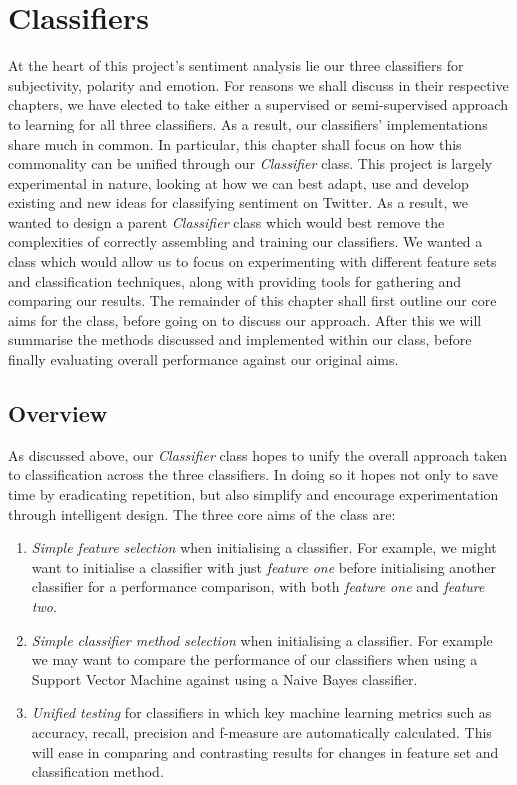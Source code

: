 \chapter{Classifiers}
\label{classifiers}

At the heart of this project's sentiment analysis lie our three classifiers for subjectivity, polarity and emotion. For reasons we shall discuss in their respective chapters, we have elected to take either a supervised or semi-supervised approach to learning for all three classifiers. As a result, our classifiers' implementations share much in common. In particular, this chapter shall focus on how this commonality can be unified through our \emph{Classifier} class. This project is largely experimental in nature, looking at how we can best adapt, use and develop existing and new ideas for classifying sentiment on Twitter. As a result, we wanted to design a parent \emph{Classifier} class which would best remove the  complexities of correctly assembling and training our classifiers. We wanted a class which would allow us to focus on experimenting with different feature sets and classification techniques, along with providing tools for gathering and comparing our results. The remainder of this chapter shall first outline our core aims for the class, before going on to discuss our approach. After this we will summarise the methods discussed and implemented within our class, before finally evaluating overall performance against our original aims.

\section{Overview}
\label{overview}

As discussed above, our \emph{Classifier} class hopes to unify the overall approach taken to classification across the three classifiers. In doing so it hopes not only to save time by eradicating repetition, but also simplify and encourage experimentation through intelligent design. The three core aims of the class are:

\begin{enumerate}
	\item \emph{Simple feature selection} when initialising a classifier. For example, we might want to initialise a classifier with just \emph{feature one} before initialising another classifier for a performance comparison, with both \emph{feature one} and \emph{feature two}.
	\item \emph{Simple classifier method selection} when initialising a classifier. For example we may want to compare the performance of our classifiers when using a Support Vector Machine against using a Naive Bayes classifier.
	\item \emph{Unified testing} for classifiers in which key machine learning metrics such as accuracy, recall, precision and f-measure are automatically calculated. This will ease in comparing and contrasting results for changes in feature set and classification method.
\end{enumerate}

